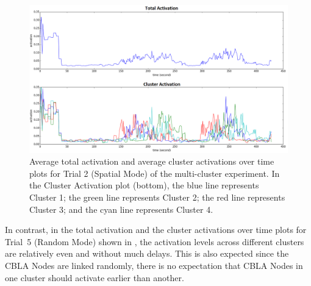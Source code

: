 \begin{figure} [!htb]
	\centering
	\includegraphics[width=1.0\textwidth]{"fig/validations/cbla_spatial_global_2015-11-16_14-33-11 - Metrics"}
	\caption[Average total activation and average cluster activations over time plots for Trial 2 (Spatial Mode) of the multi-cluster experiment]{Average total activation and average cluster activations over time plots for Trial 2 (Spatial Mode) of the multi-cluster experiment. In the Cluster Activation plot (bottom), the blue line represents Cluster 1; the green line represents Cluster 2; the red line represents Cluster 3; and the cyan line represents Cluster 4.}
	\label{fig:multi-cluster-results-spatial-2}
\end{figure}

In contrast, in the total activation and the cluster activations over time plots for Trial~5 (Random Mode) shown in , the activation levels across different clusters are relatively even and without much delays. This is also expected since the CBLA Nodes are linked randomly, there is no expectation that CBLA Nodes in one cluster should activate earlier than another.

